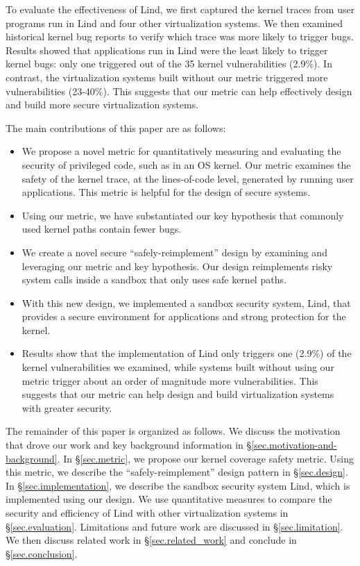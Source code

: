 To evaluate the effectiveness of Lind, we first captured the 
kernel traces from user programs run in Lind and four other virtualization
systems.
We then examined historical
kernel bug reports to verify which trace was more likely to trigger bugs.
Results showed that applications run in Lind were the least likely to
trigger kernel bugs: only one triggered out of the 35 kernel vulnerabilities 
(2.9\%). In contrast, the virtualization systems built
without our metric triggered more vulnerabilities (23-40\%). This
suggests that our metric can help effectively design and build more secure
virtualization systems.

The main contributions of this paper are as follows: %
\begin{itemize}
\item We propose a novel metric for quantitatively measuring and evaluating the
security of privileged code, such as in an OS kernel. Our metric examines
the safety of the kernel trace, at the lines-of-code level, generated by
running user applications. This metric is helpful for the design of secure systems.
\item Using our metric, we have substantiated our key hypothesis that commonly
used kernel paths contain fewer bugs. 
\item We create a novel secure ``safely-reimplement'' design by examining and
leveraging our metric and key hypothesis. 
Our design reimplements risky system calls inside a
sandbox that only uses safe kernel paths. 
\item With this new design, we implemented a sandbox security system, Lind, that
provides a secure environment for applications and strong protection for
the kernel.
\item Results show that the implementation of Lind only triggers one (2.9\%) of
the kernel vulnerabilities we examined, while systems built without using
our metric trigger about an order of magnitude more vulnerabilities. This
suggests that our metric can help design and build virtualization systems
with greater security. 
\end{itemize}


The remainder of this paper is organized as follows. 
We discuss the motivation that drove our work and key background information 
in \S{\ref{sec.motivation-and-background}}. 
In \S{\ref{sec.metric}}, we propose our kernel coverage safety metric. 
Using this metric, we describe the 
``safely-reimplement'' design pattern in \S{\ref{sec.design}}. In 
\S{\ref{sec.implementation}}, we describe the sandbox security 
system Lind, which is implemented using our design. We use quantitative 
measures to compare the security and efficiency of Lind with other 
virtualization systems in \S{\ref{sec.evaluation}}. 
Limitations and future work are discussed in \S{\ref{sec.limitation}}.  
We then discuss related work in \S{\ref{sec.related_work}} and conclude
in \S{\ref{sec.conclusion}}.

